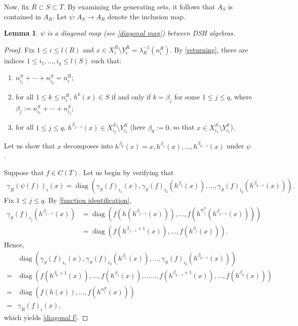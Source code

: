 \documentclass[12pt]{amsart}
\numberwithin{equation}{section}
\newtheorem{lemma}[theorem]{Lemma}
\theoremstyle{definition}
\theoremstyle{remark}
\newcommand{\diag}{\operatorname{diag}}
\begin{document}
Now, fix $R\subset S\subset T$. By examining the generating sets, it follows that $A_{S}$ is contained in $A_{R}$. Let $\psi\colon A_{S}\to A_{R}$ denote the inclusion map. 

\begin{lemma}
	\label{diagonal inclusion}
	$\psi$ is a diagonal map (see \autoref{diagonal map}) between DSH algebras. 
	\label{putnam diagonal}
\end{lemma}

\begin{proof}
	Fix $1\leq i\leq  l (R)$ and $x\in X_{i}^{R}\setminus Y_{i}^{R}=\lambda_{R}^{-1}(n_{i}^{R})$. By \autoref{returning}, there are indices $1\leq i_{1},\ldots,i_{q}\leq  l (S)$ such that:
	\begin{enumerate}
		\item $n_{i_{1}}^{S}+\cdots+n_{i_{q}}^{S}=n_{i}^{R}$;
		\item for all $1\leq k\leq n_{i}^{R}$, $h^{k}(x)\in S$ if and only if $k=\beta_{j}$ for some $1\leq j\leq q$, where $\beta_{j}:=n_{i_{1}}^{S}+\cdots+n_{i_{j}}^{S}$;
		\item for all $1\leq j\leq q$, $h^{\beta_{j-1}}(x)\in X_{i_{j}}^{S}\setminus Y_{i_{j}}^{S}$ (here $\beta_{0}:=0$, so that $x\in X_{i_{1}}^{S}\setminus Y_{i_{1}}^{S}$).
	\end{enumerate}	
	Let us show that $x$ decomposes into $h^{\beta_{0}}(x)=x,h^{\beta_{1}}(x),\ldots,h^{\beta_{q-1}}(x)$ under $\psi$. 
	
	Suppose that $f\in C(T)$. Let us begin by verifying that
	\begin{equation}
		\label{diagonal f}
		\begin{aligned}
			\gamma_{R}(\psi(f))_{i}(x)=\diag\left(\gamma_{S}(f)_{i_{1}}(x),\gamma_{S}(f)_{i_{2}}(h^{\beta_{1}}(x)),\ldots,\gamma_{S}(f)_{i_{q}}(h^{\beta_{q-1}}(x))\right).
		\end{aligned}
	\end{equation}
	Fix $1\leq j\leq q$. By \autoref{function identification},  
	$$
	\begin{aligned}
	\gamma_{S}(f)_{i_{j}}(h^{\beta_{j-1}}(x))&=\diag\left(f(h(h^{\beta_{j-1}}(x))),\ldots,f(h^{n_{i_{j}}^{S}}(h^{\beta_{j-1}}(x)))\right)\\
	&=\diag\left(f(h^{\beta_{j-1}+1}(x)),\ldots,f(h^{\beta_{j}}(x))\right).
	\end{aligned}
	$$
	Hence, 
	$$
	\begin{aligned}
	&\diag\left(\gamma_{S}(f)_{i_{1}}(x),\gamma_{S}(f)_{i_{2}}(h^{\beta_{1}}(x)),\ldots,\gamma_{S}(f)_{i_{q}}(h^{\beta_{q-1}}(x))\right)\\
	=&\diag\left(f(h^{\beta_{0}+1}(x)),\ldots,f(h^{\beta_{1}}(x)),\ldots\ldots,f(h^{\beta_{q-1}+1}(x)),\ldots,f(h^{\beta_{q}}(x))\right)\\
	=&\diag\left(f(h(x)),\ldots,f(h^{n_{i}^{R}}(x))\right)\\
	=&\gamma_{R}(f)_{i}(x),
	\end{aligned}
	$$
	which yields \autoref{diagonal f}.
	

\end{proof}
\end{document}

